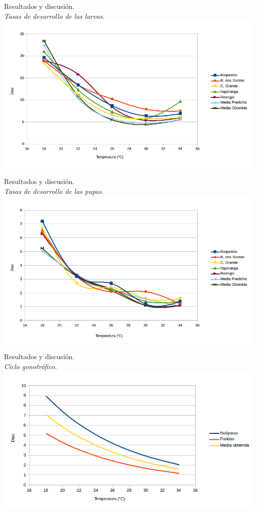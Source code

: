 \begin{frame}[t]{Resultados y discusión.\\\textit{Tasas de desarrollo de las larvas.}}
    \includegraphics[width=\textwidth]{./graphics/larvas-desarrollo.png}
\end{frame}

\begin{frame}[c]{Resultados y discusión.\\\textit{Tasas de desarrollo de las pupas.}}
    \includegraphics[width=\textwidth]{./graphics/pupas-desarrollo.png}
\end{frame}

\begin{frame}[t]{Resultados y discusión.\\\textit{Ciclo gonotrófico.}}
    \includegraphics[width=\textwidth]{./graphics/ciclo-gonotrofico-temperatura.png}
\end{frame}

